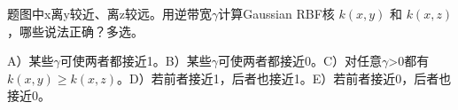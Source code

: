 题图中x离y较近、离z较远。用逆带宽\ensuremath{\gamma}计算Gaussian RBF核 \(k(x,y)\) 和 \(k(x,z)\)，哪些说法正确？多选。


A）某些\ensuremath{\gamma}可使两者都接近1。B）某些\ensuremath{\gamma}可使两者都接近0。C）对任意\ensuremath{\gamma}>0都有 \(k(x,y)\ge k(x,z)\)。D）若前者接近1，后者也接近1。E）若前者接近0，后者也接近0。
